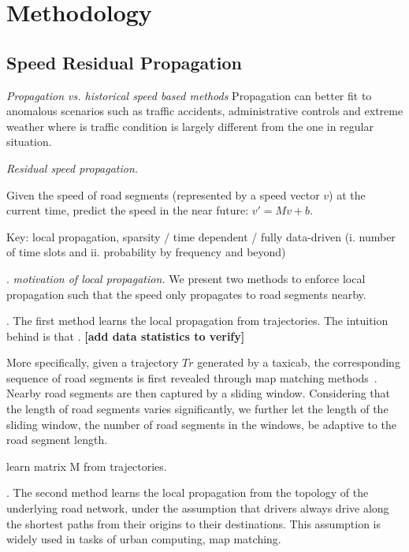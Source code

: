 \section{Methodology}
\label{sec-method}


\subsection{Speed Residual Propagation}
\label{subsec-propagation}

{\em Propagation vs. historical speed based methods}
Propagation can better fit to anomalous scenarios such as traffic accidents, administrative controls and extreme weather where is traffic condition is largely different from the one in regular situation.

{\em Residual speed propagation.}

Given the speed of road segments (represented by a speed vector $v$) at the current time, predict the speed in the near future: $v'=Mv+b$.

Key: local propagation, \ie sparsity / time dependent / fully data-driven (i. number of time slots and ii. probability by frequency and beyond)


.
{\em motivation of local propagation.}
We present two methods to enforce local propagation such that the speed only propagates to road segments nearby.

.
The first method learns the local propagation from trajectories. The intuition behind is that {\em }. {\bf [add data statistics to verify]}

More specifically, given a trajectory $Tr$ generated by a taxicab, the corresponding sequence of road segments is first revealed through map matching methods~\cite{Newson2009MM}. Nearby road segments are then captured by a sliding window. Considering that the length of road segments varies significantly, we further let the length of the sliding window, \ie the number of road segments in the windows, be adaptive to the road segment length.

\begin{example}
learn matrix M from trajectories.
\end{example}

.
The second method learns the local propagation from the topology of the underlying road network, under the assumption that drivers always drive along the shortest paths from their origins to their destinations. This assumption is widely used in tasks of urban computing, \eg map matching.

